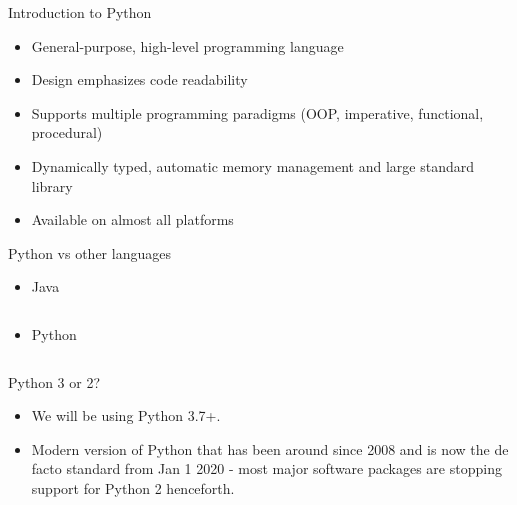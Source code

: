 \documentclass[aspectratio=169]{beamer}
\begin{document}
\begin{frame}{Introduction to Python}
    \begin{itemize}
        \item General-purpose, high-level programming language
        \item Design emphasizes code readability
        \item Supports multiple programming paradigms (OOP, imperative, functional, procedural)
        \item Dynamically typed, automatic memory management and large standard library
        \item Available on almost all platforms
    \end{itemize}
    
\end{frame}


\begin{frame}[fragile]{Python vs other languages}
\begin{itemize}
    \item Java
    \inputminted{java}{example_hello_world_java.java}
    \item Python
    \inputminted{python}{example_hello_world_python.py}
\end{itemize}
\end{frame}

\begin{frame}{Python 3 or 2?}
    \begin{itemize}
        \item We will be using Python 3.7+.
        \item Modern version of Python that has been around since 2008 and is now the de facto standard from Jan 1 2020 - most major software packages are stopping support for Python 2 henceforth.
    \end{itemize}
\end{frame} 
\end{document}
